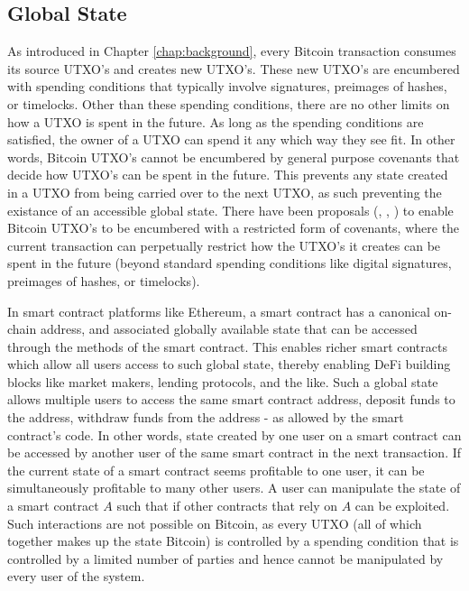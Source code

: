 \subsection{Global State}
As introduced in Chapter \ref{chap:background}, every Bitcoin transaction consumes its source UTXO's and creates new UTXO's. These new UTXO's are encumbered with spending conditions that typically involve signatures, preimages of hashes, or timelocks. Other than these spending conditions, there are no other limits on how a UTXO is spent in the future. As long as the spending conditions are satisfied, the owner of a UTXO can spend it any which way they see fit. In other words, Bitcoin UTXO's cannot be encumbered by general purpose covenants that decide how UTXO's can be spent in the future. This prevents any state created in a UTXO from being carried over to the next UTXO, as such preventing the existance of an accessible global state. There have been proposals (\cite{bitcoin_covenants}, \cite{bip119}, \cite{bip118}) to enable Bitcoin UTXO's to be encumbered with a restricted form of covenants, where the current transaction can perpetually restrict how the UTXO's it creates can be spent in the future (beyond standard spending conditions like digital signatures, preimages of hashes, or timelocks). 

In smart contract platforms like Ethereum, a smart contract has a canonical on-chain address, and associated globally available state that can be accessed through the methods of the smart contract. This enables richer smart contracts which allow all users access to such global state, thereby enabling DeFi building blocks like market makers, lending protocols, and the like. Such a global state allows multiple users to access the same smart contract address, deposit funds to the address, withdraw funds from the address - as allowed by the smart contract's code. In other words, state created by one user on a smart contract can be accessed by another user of the same smart contract in the next transaction. If the current state of a smart contract seems profitable to one user, it can be simultaneously profitable to many other users. A user can manipulate the state of a smart contract $A$ such that if other contracts that rely on $A$ can be exploited. Such interactions are not possible on Bitcoin, as every UTXO (all of which together makes up the state Bitcoin) is controlled by a spending condition that is controlled by a limited number of parties and hence cannot be manipulated by every user of the system. 

